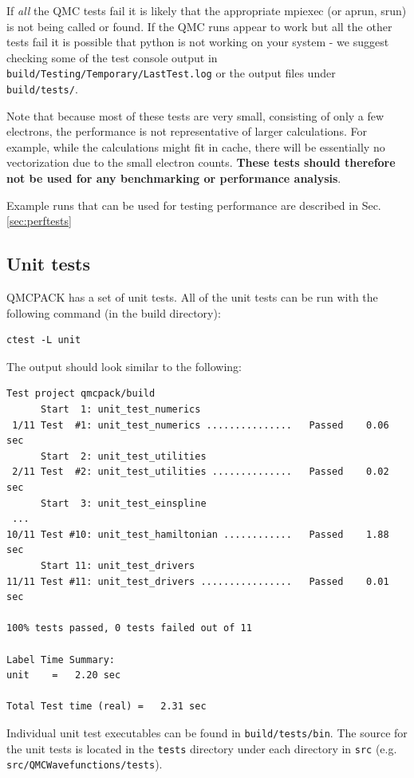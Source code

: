 If \textit{all} the QMC tests fail it is likely
that the appropriate mpiexec (or aprun, srun) is not being
called or found. If the QMC runs appear to work but all the other
tests fail it is possible that python is not working on your system -
we suggest checking some of the test console output in \texttt{build/Testing/Temporary/LastTest.log}
or the output files under \texttt{build/tests/}.


Note that because most of these tests are very small, consisting of only a few
electrons, the performance is not representative of larger
calculations. For example, while the calculations might fit in cache,
there will be essentially no vectorization due to the small electron
counts. \textbf{These tests should therefore not be used for any benchmarking or
performance analysis}.

Example runs that can be used for testing performance are described in
Sec. \ref{sec:perftests}

\subsection{Unit tests}

QMCPACK has a set of unit tests.
All of the unit tests can be run with the following command (in the build directory):
\verbatimfont{\footnotesize}
\begin{verbatim}
ctest -L unit
\end{verbatim}

The output should look similar to the following:
\verbatimfont{\footnotesize}
\begin{verbatim}
Test project qmcpack/build
      Start  1: unit_test_numerics
 1/11 Test  #1: unit_test_numerics ...............   Passed    0.06 sec
      Start  2: unit_test_utilities
 2/11 Test  #2: unit_test_utilities ..............   Passed    0.02 sec
      Start  3: unit_test_einspline
 ...
10/11 Test #10: unit_test_hamiltonian ............   Passed    1.88 sec
      Start 11: unit_test_drivers
11/11 Test #11: unit_test_drivers ................   Passed    0.01 sec

100% tests passed, 0 tests failed out of 11

Label Time Summary:
unit    =   2.20 sec

Total Test time (real) =   2.31 sec
\end{verbatim}

Individual unit test executables can be found in \texttt{build/tests/bin}.
The source for the unit tests is located in the \texttt{tests} directory under each directory in \texttt{src} (e.g. \texttt{src/QMCWavefunctions/tests}).

